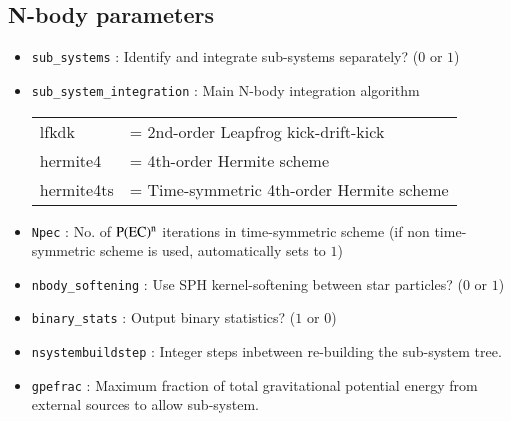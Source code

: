 \documentclass[a4paper]{article}
\newcommand{\var}[1]{\texttt{#1}}
\begin{document}
\subsection{N-body parameters}

\begin{itemize}

\item \var{sub\_systems} : Identify and integrate sub-systems separately? ($0$ or $1$)

\item \var{sub\_system\_integration} : Main N-body integration algorithm \\
\begin{tabular}{ll}
lfkdk        & = 2nd-order Leapfrog kick-drift-kick \\
hermite4     & = 4th-order Hermite scheme \\
hermite4ts   & = Time-symmetric 4th-order Hermite scheme
\end{tabular}

\item \var{Npec} : No. of ${\rm P(EC)^n}$ iterations in time-symmetric scheme (if non time-symmetric scheme is used, automatically sets to $1$)

\item \var{nbody\_softening} : Use SPH kernel-softening between star particles? ($0$ or $1$)


\item \var{binary\_stats} : Output binary statistics? ($1$ or $0$)

\item \var{nsystembuildstep} : Integer steps inbetween re-building the sub-system tree.

\item \var{gpefrac} : Maximum fraction of total gravitational potential energy from external sources to allow sub-system.



\end{itemize}
\end{document}
